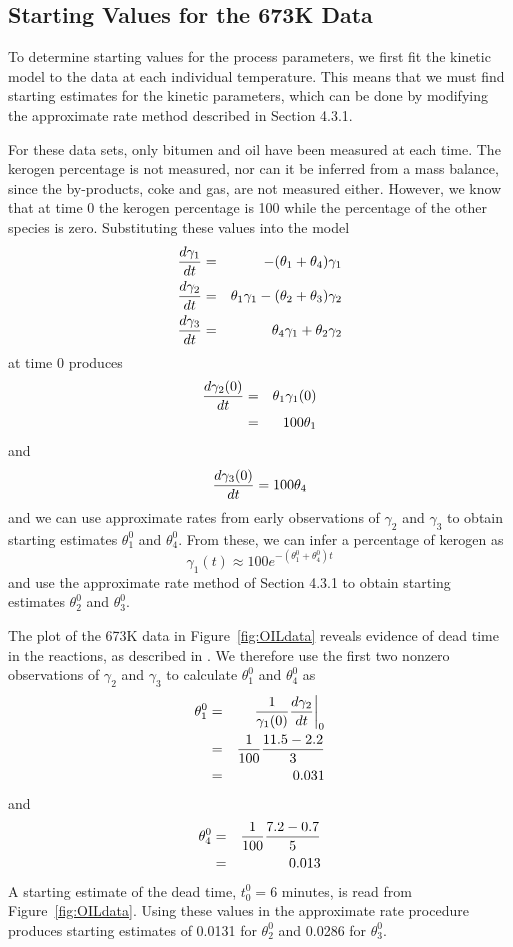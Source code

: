 \subsection{Starting Values for the 673K Data}

To determine starting values for the process parameters, we first fit
the kinetic model to the data at each individual temperature.  This
means that we must find starting estimates for the kinetic parameters,
which can be done by modifying the approximate rate method described
in Section 4.3.1.

For these data sets, only
bitumen and oil have been measured at each time.
The kerogen percentage is not measured,
nor can it be inferred from a mass balance, since the
by-products, coke and gas, are not measured either.
However, we know that at time 0 the kerogen percentage is 100
while the percentage of the other species is zero.
Substituting these values into the model
\begin{eqnarray*}
  { d \gamma_1   \over  d t }&=&- ( \theta_1 + \theta_4 ) \gamma_1\\
  {d\gamma_2\over d t }&=&\theta_1 \gamma_1 -
  ( \theta_2 + \theta_3 ) \gamma_2\\
  { d \gamma_3   \over  d t }&=&\theta_4 \gamma_1 + \theta_2 \gamma_2
\end{eqnarray*}
at time 0 produces
\begin{eqnarray*}
  {d \gamma_2 ( 0 )  \over d t}&=&\theta_1\gamma_1 ( 0 )\\
  &=& 100  \theta_1
\end{eqnarray*}
and
$$
{d \gamma_3 ( 0 )  \over d t} = 100  \theta_4
$$
and we can use approximate rates from early observations of
$\gamma_{2}$ and $\gamma_{3}$ to obtain starting estimates
$\theta_1^{0}$ and $\theta_4^{0}$.
From these, we can infer a percentage of kerogen as
$$
\gamma_1 ( t )  \approx 
100  e^{ - ( \theta_1^0 + \theta_4^0 ) t }
$$
and use the approximate rate method of Section 4.3.1 to obtain
starting estimates $\theta_2^{0}$ and $\theta_3^{0}$.

The plot of the 673K data in Figure~\ref{fig:OILdata}
reveals evidence of dead time in the reactions, as described in
.
We therefore use the first two nonzero observations of $\gamma_{2}$
and $\gamma_{3}$ to calculate $\theta_1^{0}$ and
$\theta_4^{0}$ as
\begin{eqnarray*}
  \theta_1^0&=&\left. {1 \over \gamma_1 ( 0 )} 
  {d \gamma_2  \over d t} \right|_0\\
  &=& {1 \over 100 } {11.5 - 2.2  \over 3 }\\
  &=& 0.031
\end{eqnarray*}
and
\begin{eqnarray*}
  \theta_4^0&=& {1 \over 100 } {7.2 - 0.7  \over 5 }\\
  &=&  0.013  
\end{eqnarray*}
A starting estimate of the dead time, $t_0^0 = 6$ minutes, is
read from Figure~\ref{fig:OILdata}.
Using these values in the approximate rate procedure produces
starting estimates of 0.0131 for $\theta_2^{0}$ and 0.0286
for $\theta_3^{0}$.

